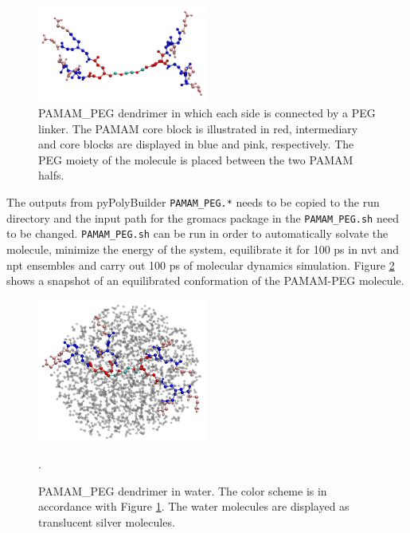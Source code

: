 \begin{figure}
    \centering
    \includegraphics[width=0.5\textwidth]{PAMAM_PEG/PAMAM_PEG_PPB.pdf}
    \caption{PAMAM\_PEG dendrimer in which each side is connected by a PEG linker. The PAMAM core block is illustrated in red, intermediary and core blocks are displayed in blue and pink, respectively. The PEG moiety of the molecule is placed between the two PAMAM halfs.}
    \label{fig:PAMAMPEGPPB}
\end{figure}

The outputs from pyPolyBuilder \texttt{PAMAM\_PEG.*} needs to be copied to the run directory and the input path for the gromacs package in the \texttt{PAMAM\_PEG.sh} need to be changed.
\texttt{PAMAM\_PEG.sh} can be run in order to automatically solvate the molecule, minimize the energy of the system, equilibrate it for 100 ps in nvt and npt ensembles and carry out 100 ps of molecular dynamics simulation.
Figure \ref{fig:PAMAMPEGSOL} shows a snapshot of an equilibrated conformation of the PAMAM-PEG molecule.


\begin{figure}
    \centering
    \includegraphics[width=0.5\textwidth]{PAMAM_PEG/PAMAM_PEG_SOL.pdf}
    \caption{PAMAM\_PEG dendrimer in water. The color scheme is in accordance with Figure \ref{fig:PAMAMPEGPPB}. The water molecules are displayed as translucent silver molecules.}.
    \label{fig:PAMAMPEGSOL}
\end{figure}